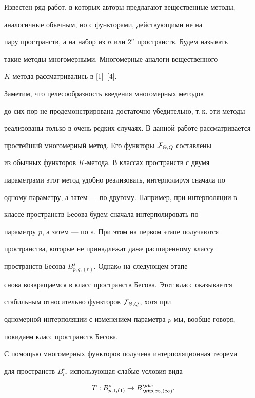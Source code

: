 Известен ряд работ, в которых авторы предлагают вещественные методы,


аналогичные обычным, но с функторами, действующими не на


пару пространств, а на набор из $n$ или $2^n$ пространств. Будем называть


такие методы многомерными. Многомерные аналоги вещественного


$K$-метода рассматривались в [1]--[4].


Заметим, что целесообразность введения многомерных методов


до сих пор не продемонстрирована достаточно убедительно, т.\,к. эти методы


реализованы только в очень редких случаях. В данной работе рассматривается


простейший многомерный метод. Его функторы ${\cal F}_{\Theta,Q}$ составлены


из обычных функторов $K$-метода. В классах пространств с двумя


параметрами этот метод удобно реализовать, интерполируя сначала по


одному параметру, а затем --- по другому. Например, при интерполяции в


классе пространств Бесова будем сначала интерполировать по


параметру $p$, а затем --- по $s$. При этом на первом этапе получаются


пространства, которые не принадлежат даже расширенному классу


пространств Бесова $B^s_{p,q,(r)}$. Однакo на следующем этапе


снова возвращаемся в класс пространств Бесова. Этот класс оказывается


стабильным относительно функторов ${\cal F}_{\Theta, Q}$, хотя при


одномерной интерполяции с изменением параметра $p$ мы, вообще говоря,


покидаем класс пространств Бесова.





С помощью многомерных функторов получена интерполяционная теорема


для пространств $B^s_p$, использующая слабые условия вида


\begin{equation}


T:B^s_{p,1,(1)}\rightarrow B{}^{\wt s}_{\wt p,\infty,(\infty) }.


\end{equation}


